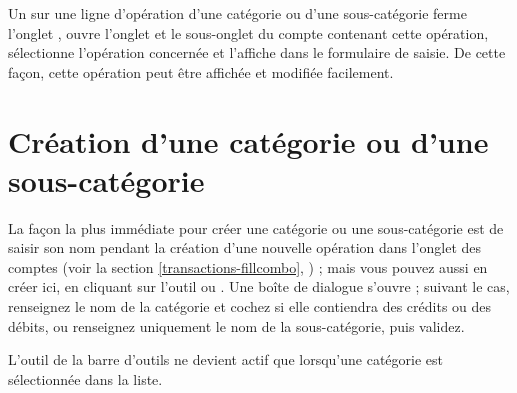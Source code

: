 Un  sur une ligne d'opération d'une catégorie ou d'une sous-catégorie ferme l'onglet , ouvre l'onglet  et le sous-onglet du compte contenant cette opération, sélectionne l'opération concernée et l'affiche dans le formulaire de saisie. De cette façon, cette opération peut être affichée et modifiée facilement.


\section{Création d'une catégorie ou d'une sous-catégorie\label{categories-new}}


\ifIllustration
\pichskip{8mm}
\label{categories-new-img}
\fi

La façon la plus immédiate pour créer une catégorie ou une sous-catégorie est de saisir son nom pendant la création d'une nouvelle opération dans l'onglet des comptes (voir la section \vref{transactions-fillcombo}, ) ; mais vous pouvez aussi en créer ici, en cliquant sur l'outil  ou . Une boîte de dialogue s'ouvre ; suivant le cas, renseignez le nom de la catégorie et cochez si elle contiendra des crédits ou des débits, ou renseignez uniquement le nom de la sous-catégorie, puis validez.

L'outil \label{categories-newsub} de la barre d'outils ne devient actif que lorsqu'une catégorie est sélectionnée dans la liste.

